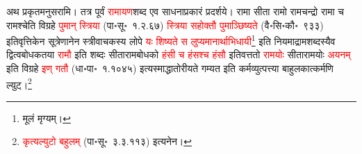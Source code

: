 \vspace{4mm}
\fontsize{14}{21}\selectfont
\begin{sloppypar}\justifying\noindent\hspace{10mm} अथ प्रकृतमनुसरामि। तत्र पूर्वं \textcolor{red}{रामायण}\-शब्द एव साधना\-प्रकारं प्रदर्शये। रामा सीता रामो रामचन्द्रो रामा च रामश्चेति विग्रहे \textcolor{red}{पुमान् स्त्रिया} (पा॰सू॰~१.२.६७) \textcolor{red}{स्त्रिया सहोक्तौ पुमाञ्छिष्यते} (वै॰सि॰कौ॰~९३३) इतिवृत्तिकेन सूत्रेणानेन स्त्री\-वाचकस्य लोपे \textcolor{red}{यः शिष्यते स लुप्यमानार्थाभिधायी}\footnote{मूलं मृग्यम्।} इति नियमाद्राम\-शब्दस्यैव द्वित्व\-बोधकतया \textcolor{red}{रामौ} इति शब्दः सीताराम\-बोधको \textcolor{red}{हंसी च हंसश्च हंसौ} इतिवत्ततो \textcolor{red}{रामयोः} सीता\-रामयोः \textcolor{red}{अयनम्‌} इति विग्रहे \textcolor{red}{इण् गतौ} (धा॰पा॰~१.१०४५) इत्यस्माद्धातोरीयते गम्यत इति कर्म\-व्युत्पत्त्या बाहुलकात्कर्मणि ल्युट्।\footnote{\textcolor{red}{कृत्यल्युटो बहुलम्‌} (पा॰सू॰~३.३.११३) इत्यनेन।}\end{sloppypar}
